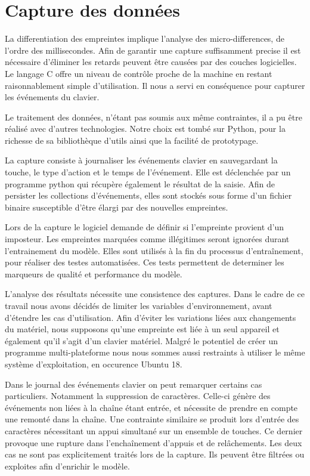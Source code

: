 \section{Capture des données}

La differentiation des empreintes implique l’analyse des micro-differences, de l’ordre des millisecondes. Afin de garantir une capture suffisamment precise il est nécessaire d’éliminer les retards peuvent être causées par des couches logicielles. Le langage C offre un niveau de contrôle proche de la machine en restant raisonnablement simple d’utilisation. Il nous a servi en conséquence pour capturer les événements du clavier. 

Le traitement des données, n’étant pas soumis aux même contraintes, il a pu être réalisé avec d’autres technologies. Notre choix est tombé sur Python, pour la richesse de sa bibliothèque d’utils ainsi que la facilité de prototypage.

La capture consiste à journaliser les événements clavier en sauvegardant la touche, le type d’action et le temps de l’événement. Elle est déclenchée par un programme python qui récupère également le résultat de la saisie. Afin de persister les collections d’événements, elles sont stockés sous forme d’un fichier binaire susceptible d’être élargi par des nouvelles empreintes.

Lors de la capture le logiciel demande de définir si l’empreinte provient d’un imposteur. Les empreintes marquées comme illégitimes seront ignorées durant l’entrainement du modèle. Elles sont utilisés à la fin du processus d’entraînement, pour réaliser des testes automatisées. Ces tests permettent de determiner les marqueurs de qualité et performance du modèle.

L’analyse des résultats nécessite une consistence des captures. Dans le cadre de ce travail nous avons décidés de limiter les variables d’environnement, avant d’étendre les cas d’utilisation. Afin d’éviter les variations liées aux changements du matériel, nous supposons qu’une empreinte est liée à un seul appareil et également qu’il s’agit d’un clavier matériel. Malgré le potentiel de créer un programme multi-plateforme nous nous sommes aussi restraints à utiliser le même système d’exploitation, en occurence Ubuntu 18.

Dans le journal des événements clavier on peut remarquer certains cas particuliers. Notamment la suppression de caractères. Celle-ci génère des événements non liées à la chaîne étant entrée, et nécessite de prendre en compte une remonté dans la chaîne. Une contrainte similaire se produit lors d’entrée des caractères nécessitant un appui simultané sur un ensemble de touches. Ce dernier provoque une rupture dans l’enchaînement d’appuis et de relâchements. Les deux cas ne sont pas explicitement traités lors de la capture. Ils peuvent être filtrées ou exploites afin d’enrichir le modèle.
